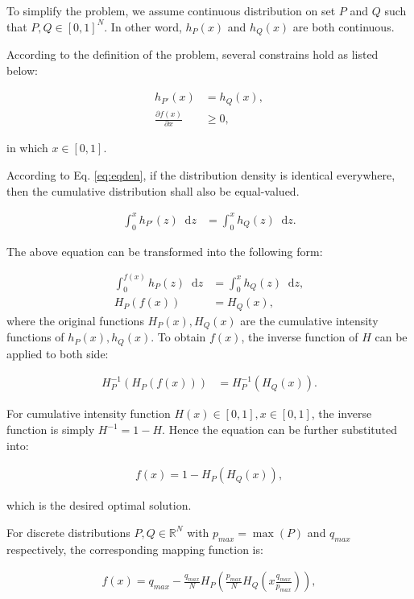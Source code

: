 \documentclass[12pt]{article}
\newcommand*\diff{\mathop{}\!\mathrm{d}}
\begin{document}
To simplify the problem, we assume continuous distribution on set $P$ and $Q$ such that $P,Q\in [0,1]^N$. In other word, $h_P(x)$ and $h_Q(x)$ are both continuous. 

According to the definition of the problem, several constrains hold as listed below:

\begin{align}
h_{P'}(x) &=h_{Q}(x),\label{eq:eqden} \\
\frac{\partial f(x)}{\partial x} & \ge 0,
\end{align}

in which $x \in [0,1] $.

According to Eq. \ref{eq:eqden}, if the distribution density is identical everywhere, then the cumulative distribution shall also be equal-valued.

\begin{align}
\int_0^x h_{P'}(z) \diff z &= \int_0^x h_{Q}(z) \diff z.
\end{align}

The above equation can be transformed into the following form:

\begin{align}
\int_0^{f(x)} h_{P}(z) \diff z &= \int_0^x h_{Q}(z) \diff z, \\
H_P(f(x)) &= H_Q(x),
\end{align}
where the original functions $H_P(x),H_Q(x)$ are the cumulative intensity functions of $h_P(x),h_Q(x)$. To obtain $f(x)$, the inverse function of $H$ can be applied to both side:

\begin{align}
H^{-1}_P \left( H_P(f(x)) \right)  &= H^{-1}_P \left( H_Q(x) \right).
\end{align}

For cumulative intensity function $H(x) \in [0,1], x\in [0,1] $, the inverse function is simply $H^{-1} = 1-H$. Hence the equation can be further substituted into:

\begin{align}
f(x) = 1 - H_P(H_Q(x)),
\end{align}

which is the desired optimal solution.

For discrete distributions $P,Q \in \mathbb{R}^N$ with $p_{max} = \max (P)$ and $q_{max}$ respectively, the corresponding mapping function is: 

\begin{align}
f(x) = q_{max} - \frac{q_{max}}{N}H_P(\frac{p_{max}}{N}H_Q(x \frac{ q_{max}}{p_{max}})),
\end{align} 
\end{document}
